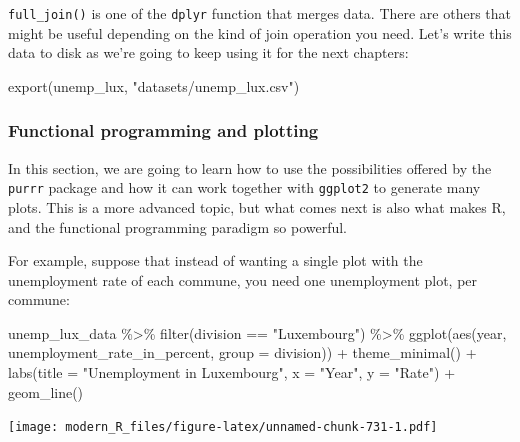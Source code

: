 \documentclass[
]{article}
\newenvironment{Shaded}{\begin{snugshade}}{\end{snugshade}}
\newcommand{\AttributeTok}[1]{\textcolor[rgb]{0.77,0.63,0.00}{#1}}
\newcommand{\FunctionTok}[1]{\textcolor[rgb]{0.00,0.00,0.00}{#1}}
\newcommand{\NormalTok}[1]{#1}
\newcommand{\SpecialCharTok}[1]{\textcolor[rgb]{0.00,0.00,0.00}{#1}}
\newcommand{\StringTok}[1]{\textcolor[rgb]{0.31,0.60,0.02}{#1}}
\begin{document}
\texttt{full\_join()} is one of the \texttt{dplyr} function that merges data. There are others that might be
useful depending on the kind of join operation you need. Let's write this data to disk as we're
going to keep using it for the next chapters:

\begin{Shaded}
\begin{Highlighting}[]
\FunctionTok{export}\NormalTok{(unemp\_lux, }\StringTok{"datasets/unemp\_lux.csv"}\NormalTok{)}
\end{Highlighting}
\end{Shaded}

\hypertarget{functional-programming-and-plotting}{%
\subsubsection{Functional programming and plotting}\label{functional-programming-and-plotting}}

In this section, we are going to learn how to use the possibilities offered by the \texttt{purrr} package
and how it can work together with \texttt{ggplot2} to generate many plots. This is a more advanced topic,
but what comes next is also what makes R, and the functional programming paradigm so powerful.

For example, suppose that instead of wanting a single plot with the unemployment rate of each
commune, you need one unemployment plot, per commune:

\begin{Shaded}
\begin{Highlighting}[]
\NormalTok{unemp\_lux\_data }\SpecialCharTok{\%\textgreater{}\%}
  \FunctionTok{filter}\NormalTok{(division }\SpecialCharTok{==} \StringTok{"Luxembourg"}\NormalTok{) }\SpecialCharTok{\%\textgreater{}\%}
  \FunctionTok{ggplot}\NormalTok{(}\FunctionTok{aes}\NormalTok{(year, unemployment\_rate\_in\_percent, }\AttributeTok{group =}\NormalTok{ division)) }\SpecialCharTok{+}
  \FunctionTok{theme\_minimal}\NormalTok{() }\SpecialCharTok{+}
  \FunctionTok{labs}\NormalTok{(}\AttributeTok{title =} \StringTok{"Unemployment in Luxembourg"}\NormalTok{, }\AttributeTok{x =} \StringTok{"Year"}\NormalTok{, }\AttributeTok{y =} \StringTok{"Rate"}\NormalTok{) }\SpecialCharTok{+}
  \FunctionTok{geom\_line}\NormalTok{()}
\end{Highlighting}
\end{Shaded}

\texttt{[image: modern\_R\_files/figure-latex/unnamed-chunk-731-1.pdf]}
\end{document}
